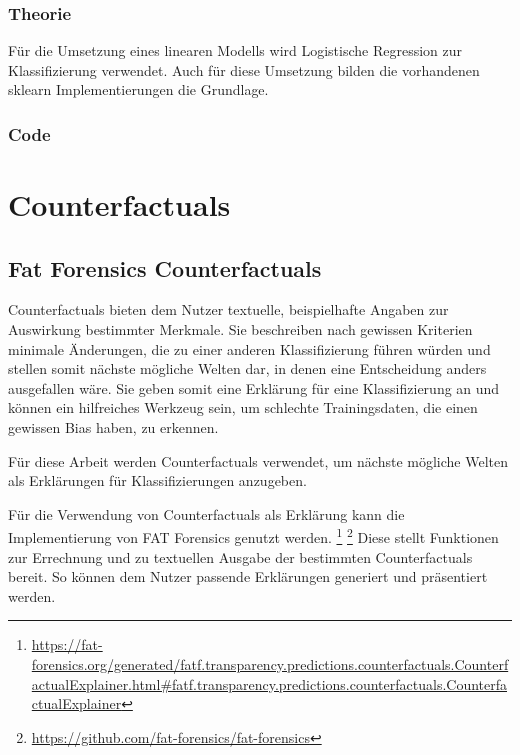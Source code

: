 \subsubsection{Theorie}
\label{subsubsection: Lin Theorie}
Für die Umsetzung eines linearen Modells wird Logistische Regression zur Klassifizierung verwendet. Auch für diese Umsetzung bilden die vorhandenen sklearn Implementierungen die Grundlage.

\subsubsection{Code}
\label{subsubsection: Lin Code}


\section{Counterfactuals}
\label{section: 3.Counterfactuals}

\subsection{Fat Forensics Counterfactuals}
\label{subsection: Fat-f CF}
\Todo[CF umschreiben!]{}
Counterfactuals bieten dem Nutzer textuelle, beispielhafte Angaben zur Auswirkung bestimmter Merkmale. Sie beschreiben nach gewissen Kriterien minimale Änderungen, die zu einer anderen Klassifizierung führen würden und stellen somit nächste mögliche Welten dar, in denen eine Entscheidung anders ausgefallen wäre. \cite{WachterCounterfactuals} Sie geben somit eine Erklärung für eine Klassifizierung an und können ein hilfreiches Werkzeug sein, um schlechte Trainingsdaten, die einen gewissen Bias haben, zu erkennen. \cite{WachterCounterfactuals}

Für diese Arbeit werden Counterfactuals verwendet, um nächste mögliche Welten als Erklärungen für Klassifizierungen anzugeben.

Für die Verwendung von Counterfactuals als Erklärung kann die Implementierung von FAT Forensics genutzt werden. \cite{SokolFatForensics} \footnote{\url{https://fat-forensics.org/generated/fatf.transparency.predictions.counterfactuals.CounterfactualExplainer.html\#fatf.transparency.predictions.counterfactuals.CounterfactualExplainer}} \footnote{\url{https://github.com/fat-forensics/fat-forensics}} Diese stellt Funktionen zur Errechnung und zu textuellen Ausgabe der bestimmten Counterfactuals bereit. So können dem Nutzer passende Erklärungen generiert und präsentiert werden. 


